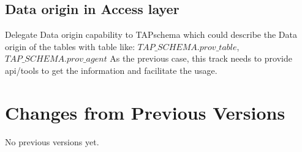 \documentclass[11pt,a4paper]{ivoa}
\begin{document}
\subsection{Data origin in Access layer}
Delegate Data origin capability to TAPschema which could describe the Data origin of the tables with table like: $TAP\_SCHEMA.prov\_table$, $TAP\_SCHEMA.prov\_agent$
As the previous case, this track needs to provide api/tools  to get the information and facilitate the usage.


\appendix
\section{Changes from Previous Versions}

No previous versions yet.  






\end{document}
